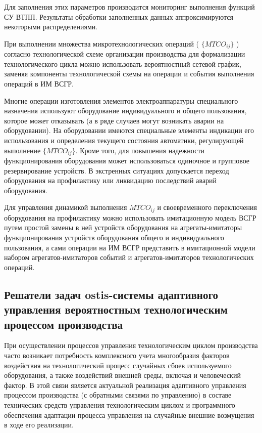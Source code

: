 Для заполнения этих параметров производится мониторинг выполнения функций СУ ВТПП. Результаты обработки заполненных данных аппроксимируются некоторыми распределениями.

При выполнении множества микротехнологических операций ( $\{MTCO_{ij}\}$ ) согласно технологической схеме организации производства для формализации технологического цикла можно использовать вероятностный сетевой график, заменяя компоненты технологической схемы на операции и события выполнения операций в ИМ ВСГР. 

Многие операции изготовления элементов электроаппаратуры специального назначения используют оборудование индивидуального и общего пользования, которое может отказывать (а в ряде случаев могут возникать аварии на оборудовании). На оборудовании имеются специальные элементы индикации его использования и определения текущего состояния автоматики, регулирующей выполнение $\{MTCO_{ij}\}$. Кроме того, для повышения надежности функционирования оборудования может использоваться одиночное и групповое резервирование устройств. В экстренных ситуациях допускается переход оборудования на профилактику или ликвидацию последствий аварий оборудования.

Для управления динамикой выполнения $MTCO_{ij}$ и своевременного переключения оборудования на профилактику можно использовать имитационную модель ВСГР путем простой замены в ней устройств оборудования на агрегаты-имитаторы функционирования устройств оборудования общего и индивидуального пользования, а сами операции на ИМ ВСГР представить в имитационной модели набором агрегатов-имитаторов событий и агрегатов-имитаторов технологических операций.



\subsection{Решатели задач ostis-системы адаптивного управления вероятностным технологическим процессом производства}

При осуществлении процессов управления технологическим циклом  производства часто возникает потребность комплексного учета многообразия факторов воздействия на технологический процесс случайных сбоев используемого оборудования, а также воздействий внешней среды, включая и человеческий фактор. В этой связи является актуальной реализация адаптивного  управления  процессом  производства (с обратными связями по управлению)  в  составе технических средств управления технологическим циклом и программного обеспечения адаптации процесса управления на случайные внешние возмущения в ходе его реализации.

